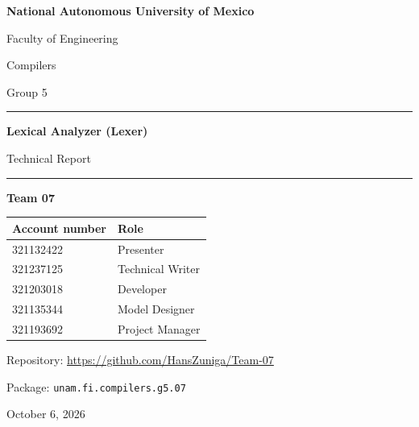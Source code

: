 \documentclass[11pt,letterpaper]{article}
\begin{document}
\sloppy

\begin{titlepage}
  \centering
  {\Large\bfseries National Autonomous University of Mexico\par}
  \vspace{0.3cm}
  {\large Faculty of Engineering\par}
  \vspace{2.2cm}
  {\large Compilers\par}
  {\large Group 5\par}
  \vspace{1.8cm}
  {\color{navy}\rule{\linewidth}{1pt}\par}
  \vspace{0.4cm}
  {\Huge\bfseries Lexical Analyzer (Lexer)\par}
  \vspace{0.3cm}
  {\Large Technical Report\par}
  \vspace{0.4cm}
  {\color{navy}\rule{\linewidth}{1pt}\par}
  \vspace{1.8cm}
  {\large\bfseries Team 07\par}
  \vspace{0.6cm}
  \begin{tabular}{ll}
    \toprule
    \textbf{Account number} & \textbf{Role} \\
    \midrule
    321132422 & Presenter \\        %
    321237125 & Technical Writer \\ %
    321203018 & Developer \\        %
    321135344 & Model Designer \\   %
    321193692 & Project Manager \\  %
    \bottomrule
  \end{tabular}

  \vfill
  {\large Repository: \url{https://github.com/HansZuniga/Team-07}\par}
  \vspace{0.3cm}
  {\large Package: \texttt{unam.fi.compilers.g5.07}\par}
  \vspace{1cm}
  {\large October 6, 2026\par}
\end{titlepage}
\end{document}
